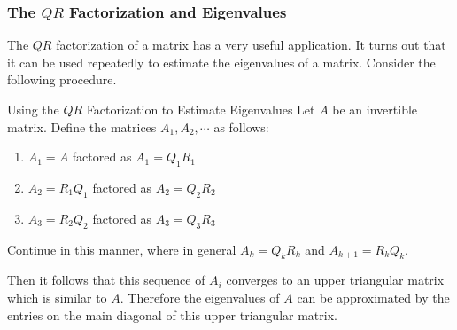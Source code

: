 \subsubsection{The $QR$ Factorization and Eigenvalues}

The $QR$ factorization of a matrix has a very useful application. It turns out that it can be used repeatedly to estimate the eigenvalues of a matrix. Consider the following procedure.

\begin{procedure}{Using the $QR$ Factorization to Estimate Eigenvalues}\label{proc:qreigenvalues}
Let $A$ be an invertible matrix. Define the matrices $A_1, A_2, \cdots$ as follows:
\begin{enumerate}
\item 
$A_1 = A$ factored as $A_1 = Q_1R_1$
\item 
$A_2 = R_1Q_1$ factored as $A_2 = Q_2R_2$
\item 
$A_3 = R_2Q_2$ factored as $A_3 = Q_3R_3$
\end{enumerate}

Continue in this manner, where in general $A_k = Q_kR_k$ and $A_{k+1} = R_kQ_k$. 

Then it follows that this sequence of $A_i$ converges to an upper triangular matrix which is similar to $A$. Therefore the eigenvalues of $A$ can be approximated by the entries on the main diagonal of this upper triangular matrix. 
\end{procedure}